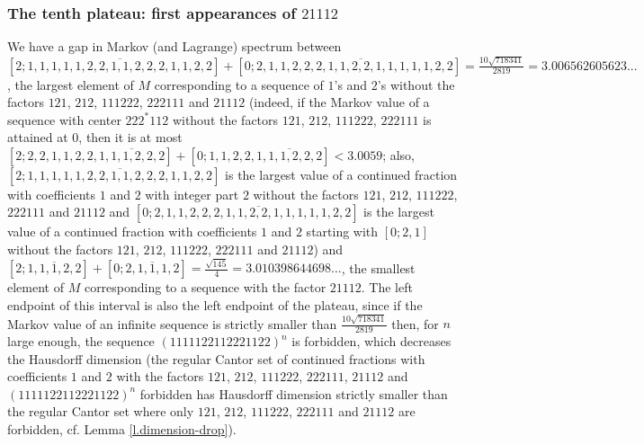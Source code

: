 \documentclass[10pt]{amsart}
\numberwithin{equation}{section}
\theoremstyle{definition}
\begin{document}
\subsubsection{The tenth plateau: first appearances of $21112$} We have a gap in Markov (and Lagrange) spectrum between $[2;\overline{1,1,1,1,1,2,2,1,1,2,2,2,1,1,2,2}]+[0;2,\overline{1,1,2,2,2,1,1,2,2,1,1,1,1,1,2,2}]=\frac{10\sqrt{718341}}{2819}=3.006562605623...$, the largest element of $M$ corresponding to a sequence of $1$'s and $2$'s without the factors $121$, $212$, $111222$, $222111$ and $21112$ (indeed, if the Markov value of a sequence with center $222^*112$ without the factors $121$, $212$, $111222$, $222111$ is attained at $0$, then it is at most $[2;2,2,1,1,2,2,\overline{1,1,1,2,2,2}]+[0;1,1,2,2,\overline{1,1,1,2,2,2}]<3.0059$; also, $[2;\overline{1,1,1,1,1,2,2,1,1,2,2,2,1,1,2,2}]$ is the largest value of a continued fraction with coefficients $1$ and $2$ with integer part $2$ without the factors $121$, $212$, $111222$, $222111$ and $21112$ and $[0;2,\overline{1,1,2,2,2,1,1,2,2,1,1,1,1,1,2,2}]$ is the largest value of a continued fraction with coefficients $1$ and $2$ starting with $[0;2,1]$ without the factors $121$, $212$, $111222$, $222111$ and $21112$) and $[2;\overline{1,1,1,2,2}]+[0;\overline{2,1,1,1,2}]=\frac{\sqrt{145}}4=3.010398644698...$, the smallest element of $M$ corresponding to a sequence with the factor $21112$. The left endpoint of this interval is also the left endpoint of the plateau, since if the Markov value of an infinite sequence is strictly smaller than $\frac{10\sqrt{718341}}{2819}$ then, for $n$ large enough, the sequence $(1111122112221122)^n$ is forbidden, which decreases the Hausdorff dimension (the regular Cantor set of continued fractions with coefficients $1$ and $2$ with the factors $121$, $212$, $111222$, $222111$, $21112$ and $(1111122112221122)^n$ forbidden has Hausdorff dimension strictly smaller than the regular Cantor set where only $121$, $212$, $111222$, $222111$ and $21112$ are forbidden, cf. Lemma \ref{l.dimension-drop}). 
\end{document}
